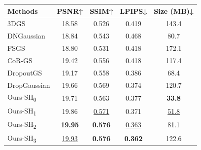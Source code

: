 \begin{tabular}{l|cccc}
\toprule
Methods & PSNR↑ & SSIM↑ & LPIPS↓ & Size (MB)↓ \\
\midrule
3DGS  & 18.58 & 0.526 & 0.419 & 143.4 \\
DNGaussian & 18.84 & 0.543 & 0.468 & 80.7 \\
FSGS  & 18.80  & 0.531 & 0.418 & 172.1 \\
CoR-GS & 19.42 & 0.556 & 0.418 & 117.4 \\
DropoutGS & 19.17 & 0.558 & 0.386 & 68.4 \\
DropGaussian & 19.66 & 0.569 & 0.374 & 120.7 \\
\midrule
Ours-SH\textsubscript{0} & 19.71 & 0.563 & 0.377 & \textbf{33.8} \\
Ours-SH\textsubscript{1} & 19.86 & \underline{0.571} & 0.371 & \underline{51.8} \\
Ours-SH\textsubscript{2} & \textbf{19.95} & \textbf{0.576} & \underline{0.363} & 81.1 \\
Ours-SH\textsubscript{3} & \underline{19.93} & \textbf{0.576} & \textbf{0.362} & 122.6 \\
\bottomrule
\end{tabular}%
